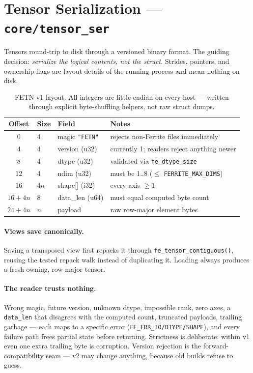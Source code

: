 \documentclass[11pt,a4paper]{article}
\begin{document}
\section{Tensor Serialization --- \texttt{core/tensor\_ser}}

Tensors round-trip to disk through a versioned binary format. The guiding
decision: \emph{serialize the logical contents, not the struct}. Strides,
pointers, and ownership flags are layout details of the running process and
mean nothing on disk.

\begin{table}[h]
\centering
\begin{tabular}{@{}clll@{}}
\toprule
\textbf{Offset} & \textbf{Size} & \textbf{Field} & \textbf{Notes} \\
\midrule
0 & 4 & magic \texttt{"FETN"} & rejects non-Ferrite files immediately \\
4 & 4 & version (u32) & currently 1; readers reject anything newer \\
8 & 4 & dtype (u32) & validated via \texttt{fe\_dtype\_size} \\
12 & 4 & ndim (u32) & must be 1..8 ($\le$ \texttt{FERRITE\_MAX\_DIMS}) \\
16 & $4n$ & shape[] (i32) & every axis $\ge 1$ \\
$16{+}4n$ & 8 & data\_len (u64) & must equal computed byte count \\
$24{+}4n$ & $n$ & payload & raw row-major element bytes \\
\bottomrule
\end{tabular}
\caption{FETN v1 layout. All integers are little-endian on every host ---
written through explicit byte-shuffling helpers, not raw struct dumps.}
\end{table}

\paragraph{Views save canonically.} Saving a transposed view first repacks it
through \texttt{fe\_tensor\_contiguous()}, reusing the tested repack walk instead
of duplicating it. Loading always produces a fresh owning, row-major tensor.

\paragraph{The reader trusts nothing.} Wrong magic, future version, unknown
dtype, impossible rank, zero axes, a \texttt{data\_len} that disagrees with the
computed count, truncated payloads, trailing garbage --- each maps to a specific
error (\texttt{FE\_ERR\_IO/DTYPE/SHAPE}), and every failure path frees partial
state before returning. Strictness is deliberate: within v1 even one extra
trailing byte is corruption. Version rejection is the forward-compatibility
seam --- v2 may change anything, because old builds refuse to guess.
\end{document}
